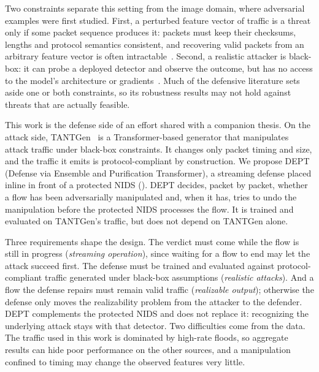 \documentclass[acmtog,nonacm,pbalance]{acmart}
\begin{document}
Two constraints separate this setting from the image domain, where adversarial
examples were first studied. First, a perturbed feature vector of traffic is
a threat only if some packet sequence produces it: packets must keep their
checksums, lengths and protocol semantics consistent, and recovering valid
packets from an arbitrary feature vector is often
intractable~\cite{pierazzi2020intriguing,hashemi2019towards}. Second, a
realistic attacker is black-box: it can probe a deployed detector and observe
the outcome, but has no access to the model's architecture or
gradients~\cite{papernot2017practical,apruzzese2023sok}. Much of the defensive
literature sets aside one or both constraints, so its robustness results may
not hold against threats that are actually feasible.

This work is the defense side of an effort shared with a companion thesis. On
the attack side, TANTGen~\cite{pissarra2026tantgen} is a Transformer-based
generator that manipulates attack traffic under black-box constraints. It
changes only packet timing and size, and the traffic it emits is
protocol-compliant by construction. We propose DEPT (Defense via Ensemble and
Purification Transformer), a streaming defense placed inline in front of a
protected NIDS (). DEPT decides, packet by packet, whether a flow
has been adversarially manipulated and, when it has, tries to undo the
manipulation before the protected NIDS processes the flow. It is trained and
evaluated on TANTGen's traffic, but does not depend on TANTGen alone.

Three requirements shape the design. The verdict must come while the flow is
still in progress (\emph{streaming operation}), since waiting for a flow to end
may let the attack succeed first. The defense must be trained and evaluated
against protocol-compliant traffic generated under black-box assumptions
(\emph{realistic attacks}). And a flow the defense repairs must remain valid
traffic (\emph{realizable output}); otherwise the defense only moves the
realizability problem from the attacker to the defender. DEPT complements the
protected NIDS and does not replace it: recognizing the underlying attack stays
with that detector. Two difficulties come from the data. The traffic used in this
work is dominated by high-rate floods, so aggregate results can hide poor
performance on the other sources, and a manipulation confined to timing may change the observed features
very little.
\end{document}
